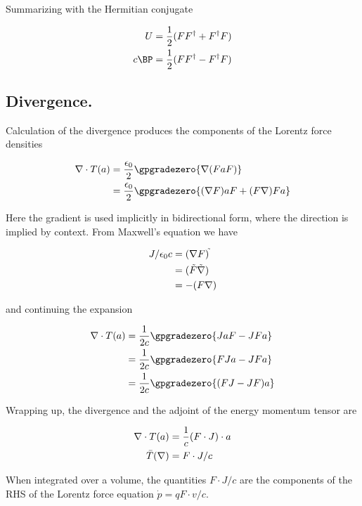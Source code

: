 \documentclass[]{eliblog}
\begin{document}
Summarizing with the Hermitian conjugate

\begin{align}
U &= \frac{1}{2}( F F^\dagger + F^\dagger F) \\
c \BP &= \frac{1}{2}( F F^\dagger - F^\dagger F)
\end{align}

\subsection{ Divergence. }

Calculation of the divergence produces the components of the Lorentz force densities

\begin{align*}
\grad \cdot T(a)
&= \frac{\epsilon_0}{2} \gpgradezero{ \grad (F a F) } \\
&= \frac{\epsilon_0}{2} \gpgradezero{ (\grad F) a F + (F \grad) F a } \\
\end{align*}

Here the gradient is used implicitly in bidirectional form, where the direction is implied by context.
From Maxwell's equation we have

\begin{align*}
J/\epsilon_0 c
&= (\nabla F)^{\tilde{}} \\
&= (\tilde{F} \tilde{\nabla}) \\
&= -(F \nabla)
\end{align*}

and continuing the expansion

\begin{align*}
\grad \cdot T(a)
&= \frac{1}{2c} \gpgradezero{ J a F - J F a } \\
&= \frac{1}{2c} \gpgradezero{ F J a - J F a } \\
&= \frac{1}{2c} \gpgradezero{ (F J - J F) a } \\
\end{align*}

Wrapping up, the divergence and the adjoint of the energy momentum tensor are

\begin{align}
\nabla \cdot T(a) &= \frac{1}{c} (F \cdot J) \cdot a \\
\bar{T}(\nabla) &= F \cdot J/c
\end{align}

When integrated over a volume, the quantities $F \cdot J/c$ are the components of the RHS of the Lorentz
force equation $\dot{p} = q F \cdot v/c$.



\end{document}
